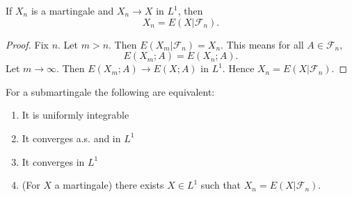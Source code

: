 \begin{lemma}
		\label{lem:mart-lemma}
		If $X_n $ is a martingale and $X_n \to  X$ in $L^1$, then 
		\[
			X_n = E(X | \mathcal{F}_n)
		.\] 
	\end{lemma}
	\begin{proof}
		Fix $n$. Let $m > n$. Then $E(X_m | \mathcal{F}_n) = X_n$.
		This means for all $ A \in \mathcal{F}_n$,
		\[
			E(X_m ; A) = E(X_n ; A)
		.\] 
		Let $ m\to \infty $. Then $E(X_m ; A) \to E(X;A)$ in $L^1$. Hence $X_n = E(X | \mathcal{F}_n)$.
\end{proof}
\begin{theorem}
	For a submartingale the following are equivalent:
	\begin{enumerate}
		\item It is uniformly integrable
		\item It converges a.s. and in $L^1$
		\item It converges in $L^1$ 
		\item (For $X$ a martingale) there exists $X \in L^1$ such that $X_n = E(X | \mathcal{F}_n)$.
	\end{enumerate}
\end{theorem}
